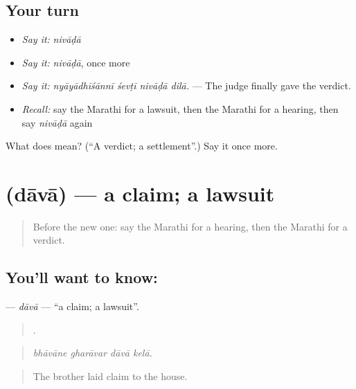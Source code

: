 \subsection*{Your turn}
\begin{itemize}
\raggedright
  \item \emph{Say it:} \emph{nivāḍā}
  \item \emph{Say it:} \emph{nivāḍā}, once more
  \item \emph{Say it:} \emph{nyāyādhīśānnī śevṭī nivāḍā dilā.} — The judge finally gave the verdict.
  \item \emph{Recall:} say the Marathi for a lawsuit, then the Marathi for a hearing, then say \emph{nivāḍā} again
\end{itemize}

\begin{tcolorbox}[breakable,colback=teal!4,colframe=teal!35!black,title={Before you move on}]
What does  mean? (\textquotedblleft{}A verdict; a settlement\textquotedblright{}.) Say it once more.
\end{tcolorbox}
\section[\texorpdfstring{\mr{दावा} (dāvā)}{दावा (dāvā)}]{ (dāvā) — a claim; a lawsuit}

\label{lesson:MR-C359-dava}



\begin{quote}
Before the new one: say the Marathi for a hearing, then the Marathi for a verdict.
\end{quote}

\subsection*{You'll want to know: }
\textbf{} — \emph{dāvā} — \textquotedblleft{}a claim; a lawsuit\textquotedblright{}.

\begin{quote}
   .
\end{quote}

\begin{quote}
\emph{bhāvāne gharāvar dāvā kelā.}
\end{quote}

\begin{quote}
The brother laid claim to the house.
\end{quote}

